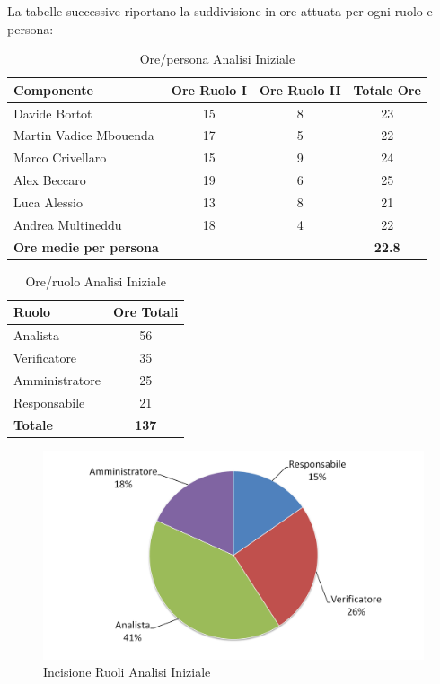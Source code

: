 \documentclass[a4paper,11pt]{article}
\begin{document}
		La tabelle successive riportano la suddivisione in ore attuata per ogni ruolo e persona:
		\begin{table}[h!]			
		\begin{center}
			\begin{tabular}{l c c c}
			\textbf{Componente} & \textbf{Ore Ruolo I} & \textbf{Ore Ruolo II} & \textbf{Totale Ore}\\
			\midrule
			Davide Bortot & 15 & 8 & 23\\
			Martin Vadice Mbouenda & 17 & 5 & 22\\
			Marco Crivellaro & 15 & 9 & 24 \\
			Alex Beccaro & 19 & 6 & 25\\
			Luca Alessio & 13 & 8 & 21\\
			Andrea Multineddu & 18 & 4 & 22\\
			\midrule
			\textbf{Ore medie per persona} & & & \textbf{22.8}\\
			\end{tabular}
		\end{center}
		\caption{Ore/persona Analisi Iniziale}
		\end{table}
		\begin{table}[h!]			
		\begin{center}
			\begin{tabular}{l c}
			\textbf{Ruolo} & \textbf{Ore Totali} \\
			\midrule
			Analista & 56\\
			Verificatore & 35\\
			Amministratore & 25 \\
			Responsabile & 21\\
			\midrule
			\textbf{Totale} & \textbf{137}\\
			\end{tabular}
		\end{center}
		\caption{Ore/ruolo Analisi Iniziale}
		\end{table}
		\begin{figure}[h!]
		    \centering
			\includegraphics[scale=0.55]{../Images/pie_chart-Analisi_Iniziale}
			\caption{Incisione Ruoli Analisi Iniziale}
		\end{figure}
		
\end{document}
